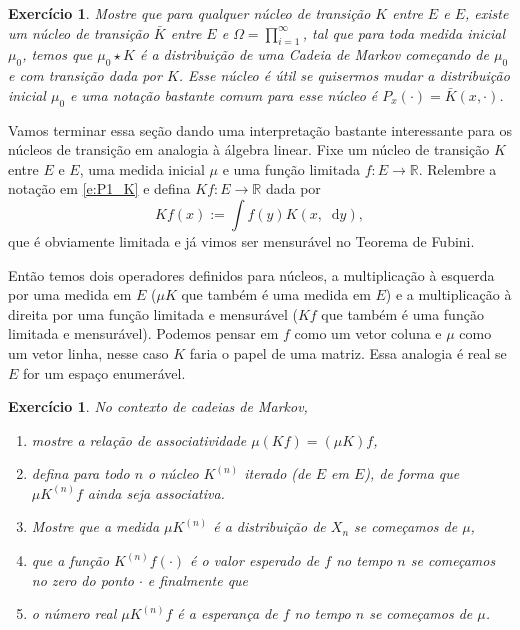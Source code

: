 \documentclass[reqno, final]{book}
\newcommand*\1{\mathds{1}}
\newtheorem{exercise}[example]{Exercício}
\renewcommand*\d{\mathop{}\!\mathrm{d}}
\begin{document}
\begin{exercise}
  Mostre que para qualquer núcleo de transição $K$ entre $E$ e $E$, existe um núcleo de transição $\bar K$ entre $E$ e $\Omega = \prod_{i=1}^\infty$, tal que para toda medida inicial $\mu_0$, temos que $\mu_0 \star K$ é a distribuição de uma Cadeia de Markov começando de $\mu_0$ e com transição dada por $K$.
  Esse núcleo é útil se quisermos mudar a distribuição inicial $\mu_0$ e uma notação bastante comum para esse núcleo é $P_{x}(\cdot) = \bar K(x, \cdot)$.
\end{exercise}

Vamos terminar essa seção dando uma interpretação bastante interessante para os núcleos de transição em analogia à álgebra linear.
Fixe um núcleo de transição $K$ entre $E$ e $E$, uma medida inicial $\mu$ e uma função limitada $f: E \to \mathbb{R}$.
Relembre a notação em \eqref{e:P1_K} e defina $K f: E \to \mathbb{R}$ dada por
\begin{equation}
  K f(x):= \int f(y) K(x, \d y),
\end{equation}
que é obviamente limitada e já vimos ser mensurável no Teorema de Fubini.

Então temos dois operadores definidos para núcleos, a multiplicação à esquerda por uma medida em $E$ ($\mu K$ que também é uma medida em $E$) e a multiplicação à direita por uma função limitada e mensurável ($K f$ que também é uma função limitada e mensurável).
Podemos pensar em $f$ como um vetor coluna e $\mu$ como um vetor linha, nesse caso $K$ faria o papel de uma matriz.
Essa analogia é real se $E$ for um espaço enumerável.

\begin{exercise}
  No contexto de cadeias de Markov,
  \begin{enumerate}[\quad a)]
  \item mostre a relação de associatividade $\mu (K f) = (\mu K) f$,
  \item defina para todo $n$ o núcleo $K^{(n)}$ iterado (de $E$ em $E$), de forma que $\mu K^{(n)} f$ ainda seja associativa.
  \item Mostre que a medida $\mu K^{(n)}$ é a distribuição de $X_n$ se começamos de $\mu$,
  \item que a função $K^{(n)} f (\cdot)$ é o valor esperado de $f$ no tempo $n$ se começamos no zero do ponto $\cdot$ e finalmente que
  \item o número real $\mu K^{(n)} f$ é a esperança de $f$ no tempo $n$ se começamos de $\mu$.
  \end{enumerate}
\end{exercise}
\end{document}
